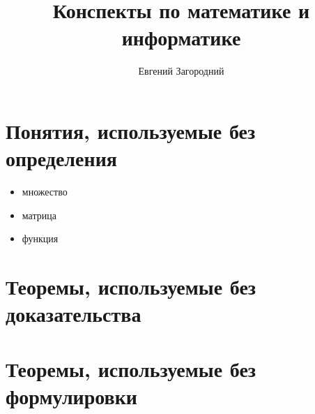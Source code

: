 \documentclass[a4paper]{book}
\title{Конспекты по математике и информатике}
\author{Евгений Загородний}
\begin{document}
\frontmatter
\maketitle

\tableofcontents


\mainmatter









\appendix
\chapter{Понятия, используемые без определения}

\begin{itemize}
  \item множество
  \item матрица
  \item функция
\end{itemize}

\chapter{Теоремы, используемые без доказательства}
\chapter{Теоремы, используемые без формулировки}

\backmatter
\printbibliography
\end{document}
